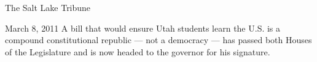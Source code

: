 \begin{frame}{The Salt Lake Tribune}
    \begin{block}{March 8, 2011}
    A bill that would ensure Utah students learn the U.S. is a compound constitutional republic --- not a democracy --- has passed both
    Houses of the Legislature and is now headed to the governor for his signature.
    \end{block}
\end{frame}
%

